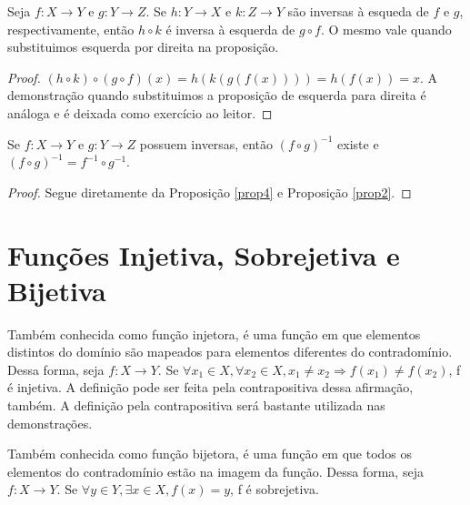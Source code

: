 \begin{theorem}
     \label{prop4}
     Seja $f: X \to Y $ e $g: Y \to Z$. Se $h: Y \to X$ e $k: Z \to Y$ são inversas à esqueda de $f$ e $g$,
     respectivamente, então $h \circ k$ é inversa à esquerda de $g \circ f$. O mesmo vale quando substituimos
     esquerda por direita na proposição.
\end{theorem}

\begin{proof}
 $(h \circ k)\circ(g \circ f)(x) = h(k(g(f(x)))) = h(f(x)) = x $. A demonstração quando substituimos a proposição
 de esquerda para direita é análoga e é deixada como exercício ao leitor.
\end{proof}

\begin{corollary}
    \label{cor1}
    Se $f: X \to Y$ e $g: Y \to Z$ possuem inversas, então $(f \circ g)^{-1}$ existe e
    $(f \circ g)^{-1} = f^{-1} \circ g^{-1}$.
\end{corollary}

\begin{proof}
    Segue diretamente da Proposição \ref{prop4} e Proposição \ref{prop2}.
\end{proof}

\section{Funções Injetiva, Sobrejetiva e Bijetiva}

\begin{definition}
    \label{def5}
    Também conhecida como função injetora, é uma função em que elementos distintos do domínio são
    mapeados para elementos diferentes do contradomínio. Dessa forma, seja $f: X \to Y$. Se
    $\forall x_1 \in X, \forall x_2 \in X, x_1 \neq x_2 \Rightarrow f(x_1) \neq f(x_2) $, f é injetiva.
    A definição pode ser feita pela contrapositiva dessa afirmação, também. A definição pela contrapositiva
    será bastante utilizada nas demonstrações.
\end{definition}

\begin{definition}
    \label{def6}
    Também conhecida como função bijetora, é uma função em que todos os elementos do contradomínio
    estão na imagem da função. Dessa forma, seja $f: X \to Y$. Se $\forall y \in Y, \exists x \in X, f(x) = y$,
    f é sobrejetiva.
   \end{definition}

